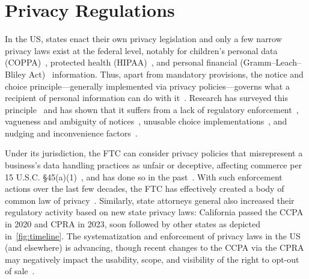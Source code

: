 \vspace{-2mm}
\section{Privacy Regulations}
\label{sec:regulations}

\vspace{-3mm}
\label{sec:us-regulations}
In the US, states enact their own privacy legislation and only a few narrow privacy laws exist at the federal level, notably for children’s personal data (COPPA)~\cite{ChildrensOnlinePrivacy2013}, protected health (HIPAA)~\cite{rightsocrHIPAAPrivacyRule2008}, and personal financial (Gramm–Leach–Bliley Act)~\cite{GrammLeachBlileyAct2013} information. Thus, apart from mandatory provisions, the notice and choice principle---generally implemented via privacy policies---governs what a recipient of personal information can do with it~\cite{zimmeckInformationPrivacyLaw2013}. 
%
Research has surveyed this principle~\cite{schaubDesignSpaceEffective2015} and has shown that it suffers from a lack of regulatory enforcement~\cite{cranorNecessaryNotSufficient2012}, vagueness and ambiguity of notices~\cite{reidenbergAmbiguityPrivacyPolicies2016}, unusable choice implementations~\cite{habibItsScavengerHunt2020}, and nudging and inconvenience factors~\cite{oconnorUnclearInconspicuousRight2021}.

Under its jurisdiction, the FTC can consider privacy policies that misrepresent a business's data handling practices as unfair or deceptive, affecting commerce per 15 U.S.C. §45(a)(1)~\cite{unitedstates:congress:houseofrepresentatives:officeofthelawrevisioncounselUnfairMethodsCompetition2023}, and has done so in the past~\cite{ftcSnapchatSettlesFTC2014,FTCImposes52019}. With such enforcement actions over the last few decades, the FTC has effectively created a body of common law of privacy~\cite{soloveFTCNewCommon2013}.  
%
Similarly, state attorneys general also increased their regulatory activity based on new state privacy laws: California passed the CCPA in 2020 and CPRA in 2023, soon followed by other states as depicted in~\autoref{fig:timeline}.
%
The systematization and enforcement of privacy laws in the US (and elsewhere) is advancing, though recent changes to the CCPA via the CPRA may negatively impact the usability, scope, and visibility of the right to opt-out of sale~\cite{charatanTwoStepsForward2024}.

